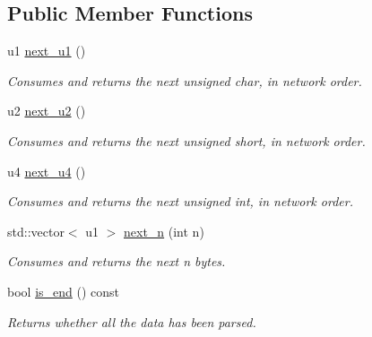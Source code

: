 \subsection*{Public Member Functions}
\begin{DoxyCompactItemize}
\item 
\mbox{\label{classBytesParser_a18a5ff71458418a33c99d301ecc37579}} 
u1 \hyperlink{classBytesParser_a18a5ff71458418a33c99d301ecc37579}{next\+\_\+u1} ()
\begin{DoxyCompactList}\small\item\em Consumes and returns the next unsigned char, in network order. \end{DoxyCompactList}\item 
\mbox{\label{classBytesParser_a8c1d8a37eabff268351e38706a78ce2a}} 
u2 \hyperlink{classBytesParser_a8c1d8a37eabff268351e38706a78ce2a}{next\+\_\+u2} ()
\begin{DoxyCompactList}\small\item\em Consumes and returns the next unsigned short, in network order. \end{DoxyCompactList}\item 
\mbox{\label{classBytesParser_a1023beb9a406a24c4080c95fbe8fd884}} 
u4 \hyperlink{classBytesParser_a1023beb9a406a24c4080c95fbe8fd884}{next\+\_\+u4} ()
\begin{DoxyCompactList}\small\item\em Consumes and returns the next unsigned int, in network order. \end{DoxyCompactList}\item 
\mbox{\label{classBytesParser_acb95ccefd93aa90ae9c74aaec13b497e}} 
std\+::vector$<$ u1 $>$ \hyperlink{classBytesParser_acb95ccefd93aa90ae9c74aaec13b497e}{next\+\_\+n} (int n)
\begin{DoxyCompactList}\small\item\em Consumes and returns the next {\ttfamily n} bytes. \end{DoxyCompactList}\item 
\mbox{\label{classBytesParser_a0cef47c62af80c1a50fc507c5a869757}} 
bool \hyperlink{classBytesParser_a0cef47c62af80c1a50fc507c5a869757}{is\+\_\+end} () const
\begin{DoxyCompactList}\small\item\em Returns whether all the data has been parsed. \end{DoxyCompactList}\item 

\end{DoxyCompactItemize}
